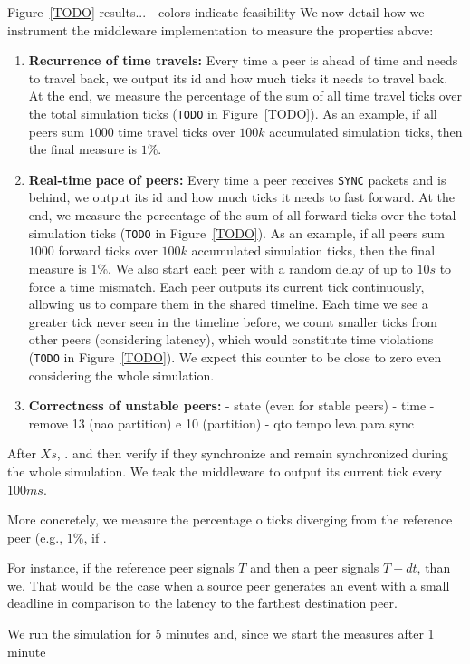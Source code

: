 \documentclass[10pt,journal,compsoc]{IEEEtran}
\newcommand{\code}[1]  {\texttt{\footnotesize{#1}}}
\begin{document}
Figure~\ref{TODO} results...
- colors indicate feasibility
%
We now detail how we instrument the middleware implementation to measure the
properties above:
%
\begin{enumerate}
%
\item \textbf{Recurrence of time travels:}
Every time a peer is ahead of time and needs to travel back, we output its id
and how much ticks it needs to travel back.
At the end, we measure the percentage of the sum of all time travel ticks over
the total simulation ticks (\code{TODO} in Figure~\ref{TODO}).
As an example, if all peers sum $1000$ time travel ticks over $100k$
accumulated simulation ticks, then the final measure is $1\%$.
%
\item \textbf{Real-time pace of peers:}
Every time a peer receives \code{SYNC} packets and is behind, we output its id
and how much ticks it needs to fast forward.
At the end, we measure the percentage of the sum of all forward ticks over the
total simulation ticks (\code{TODO} in Figure~\ref{TODO}).
As an example, if all peers sum $1000$ forward ticks over $100k$ accumulated
simulation ticks, then the final measure is $1\%$.
%
We also start each peer with a random delay of up to $10s$ to force a time
mismatch.
%
Each peer outputs its current tick continuously, allowing us to compare them
in the shared timeline.
Each time we see a greater tick never seen in the timeline before, we count
smaller ticks from other peers (considering latency), which would constitute
time violations (\code{TODO} in Figure~\ref{TODO}).
We expect this counter to be close to zero even considering the whole
simulation.
%
\item \textbf{Correctness of unstable peers:}
- state (even for stable peers)
- time
- remove 13 (nao partition) e 10 (partition)
- qto tempo leva para sync
%
\end{enumerate}

After $Xs$, .
and then verify if they synchronize and remain synchronized during the whole
simulation.
We teak the middleware to output its current tick every $100ms$.

More concretely, we measure the percentage o ticks diverging from the reference
peer (e.g., $1\%$, if .

For instance, if the reference peer signals $T$ and then a peer signals $T-dt$,
than we.
That would be the case when a source peer generates an event with a small
deadline in comparison to the latency to the farthest destination peer.

We run the simulation for 5 minutes and, since we start the measures after 1 minute
\end{document}

